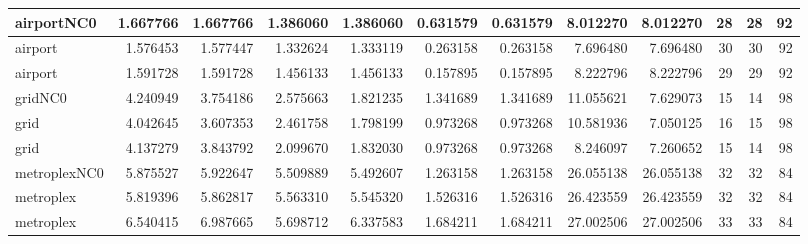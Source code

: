 \begin{longtable}{|l|r|r|r|r|r|r|r|r|r|r|r|}
airportNC0 & 1.667766 & 1.667766 & 1.386060 & 1.386060 & 0.631579 & 0.631579 & 8.012270 & 8.012270 & 28 & 28 & 92 \\ \hline
airport & 1.576453 & 1.577447 & 1.332624 & 1.333119 & 0.263158 & 0.263158 & 7.696480 & 7.696480 & 30 & 30 & 92 \\ \hline
airport & 1.591728 & 1.591728 & 1.456133 & 1.456133 & 0.157895 & 0.157895 & 8.222796 & 8.222796 & 29 & 29 & 92 \\ \hline
gridNC0 & 4.240949 & 3.754186 & 2.575663 & 1.821235 & 1.341689 & 1.341689 & 11.055621 & 7.629073 & 15 & 14 & 98 \\ \hline
grid & 4.042645 & 3.607353 & 2.461758 & 1.798199 & 0.973268 & 0.973268 & 10.581936 & 7.050125 & 16 & 15 & 98 \\ \hline
grid & 4.137279 & 3.843792 & 2.099670 & 1.832030 & 0.973268 & 0.973268 & 8.246097 & 7.260652 & 15 & 14 & 98 \\ \hline
metroplexNC0 & 5.875527 & 5.922647 & 5.509889 & 5.492607 & 1.263158 & 1.263158 & 26.055138 & 26.055138 & 32 & 32 & 84 \\ \hline
metroplex & 5.819396 & 5.862817 & 5.563310 & 5.545320 & 1.526316 & 1.526316 & 26.423559 & 26.423559 & 32 & 32 & 84 \\ \hline
metroplex & 6.540415 & 6.987665 & 5.698712 & 6.337583 & 1.684211 & 1.684211 & 27.002506 & 27.002506 & 33 & 33 & 84 \\ \hline
\end{longtable}
